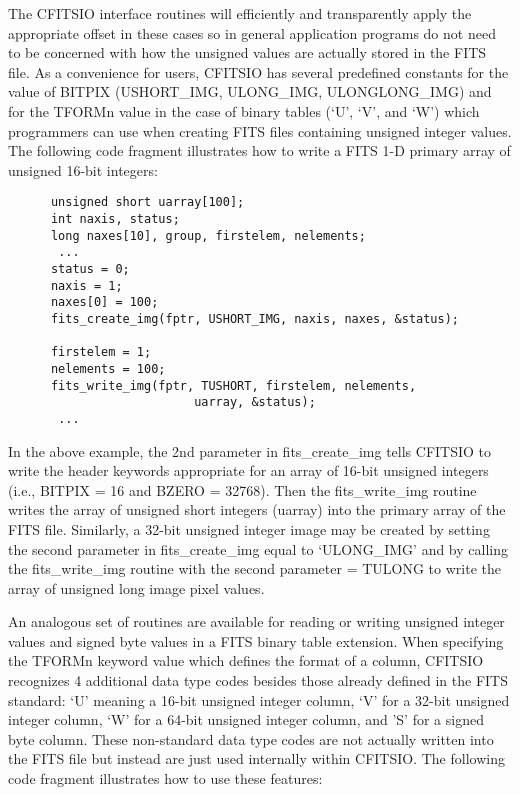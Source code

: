 \documentclass[11pt]{book}
\begin{document}
The CFITSIO interface routines will efficiently and transparently apply
the appropriate offset in these cases so in general application
programs do not need to be concerned with how the unsigned values are
actually stored in the FITS file.  As a convenience for users, CFITSIO
has several predefined constants for the value of BITPIX  (USHORT\_IMG,
ULONG\_IMG, ULONGLONG\_IMG) and for the TFORMn value in the case of binary tables (`U',
`V', and `W') which programmers can use when creating FITS files containing
unsigned integer values.  The following code fragment illustrates how
to write a FITS 1-D primary array of unsigned 16-bit integers:

\begin{verbatim}
      unsigned short uarray[100];
      int naxis, status;
      long naxes[10], group, firstelem, nelements;
       ...
      status = 0;
      naxis = 1;
      naxes[0] = 100;
      fits_create_img(fptr, USHORT_IMG, naxis, naxes, &status);

      firstelem = 1;
      nelements = 100;
      fits_write_img(fptr, TUSHORT, firstelem, nelements,
                          uarray, &status);
       ...
\end{verbatim}
In the above example, the 2nd parameter in fits\_create\_img tells
CFITSIO to write the header keywords appropriate for an array of 16-bit
unsigned integers (i.e., BITPIX = 16 and BZERO = 32768).  Then the
fits\_write\_img routine writes the array of unsigned short integers
(uarray) into the primary array of the FITS file.  Similarly, a 32-bit
unsigned integer image may be created by setting the second parameter
in fits\_create\_img equal to `ULONG\_IMG' and by calling the
fits\_write\_img routine with the second parameter = TULONG to write
the array of unsigned long image pixel values.

An analogous set of routines are available for reading or writing unsigned
integer values and signed byte values in a FITS binary table extension.
When specifying the TFORMn keyword value which defines the format of a
column, CFITSIO recognizes 4 additional data type codes besides those
already defined in the FITS standard: `U' meaning a 16-bit unsigned
integer column, `V' for a 32-bit unsigned integer column, `W' for a 64-bit
unsigned integer column, and 'S'
for a signed byte column.  These non-standard data type codes are not
actually written into the FITS file but instead are just used internally
within CFITSIO.  The following code fragment illustrates how to use
these features:
\end{document}
